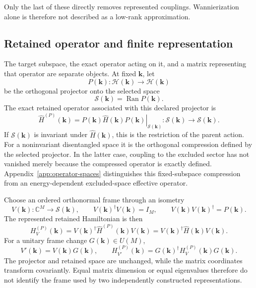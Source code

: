 Only the last of these directly removes represented couplings. Wannierization
alone is therefore not described as a low-rank approximation.

\subsection{Retained operator and finite representation}

The target subspace, the exact operator acting on it, and a matrix representing
that operator are separate objects. At fixed $\mathbf k$, let
\begin{equation}
  P(\mathbf k):
  \mathcal H(\mathbf k)
  \longrightarrow
  \mathcal H(\mathbf k)
\end{equation}
be the orthogonal projector onto the selected space
\begin{equation}
  \mathcal S(\mathbf k)
  =
  \operatorname{Ran}P(\mathbf k).
\end{equation}
The exact retained operator associated with this declared projector is
\begin{equation}
  \widehat H^{(P)}(\mathbf k)
  =
  \left.
    P(\mathbf k)\widehat H(\mathbf k)P(\mathbf k)
  \right|_{\mathcal S(\mathbf k)}:
  \mathcal S(\mathbf k)
  \longrightarrow
  \mathcal S(\mathbf k).
\end{equation}
If $\mathcal S(\mathbf k)$ is invariant under $\widehat H(\mathbf k)$, this is
the restriction of the parent action. For a noninvariant disentangled space it
is the orthogonal compression defined by the selected projector. In the latter
case, coupling to the excluded sector has not vanished merely because the
compressed operator is exactly defined. Appendix~\ref{app:operator-spaces}
distinguishes this fixed-subspace compression from an energy-dependent
excluded-space effective operator.

Choose an ordered orthonormal frame through an isometry
\begin{equation}
  V(\mathbf k):
  \mathbb C^M
  \longrightarrow
  \mathcal S(\mathbf k),
  \qquad
  V(\mathbf k)^{\dagger}V(\mathbf k)=I_M,
  \qquad
  V(\mathbf k)V(\mathbf k)^{\dagger}=P(\mathbf k).
\end{equation}
The represented retained Hamiltonian is then
\begin{equation}
  H_V^{(P)}(\mathbf k)
  =
  V(\mathbf k)^{\dagger}
  \widehat H^{(P)}(\mathbf k)
  V(\mathbf k)
  =
  V(\mathbf k)^{\dagger}
  \widehat H(\mathbf k)
  V(\mathbf k).
\end{equation}
For a unitary frame change $G(\mathbf k)\in U(M)$,
\begin{equation}
  V'(\mathbf k)=V(\mathbf k)G(\mathbf k),
  \qquad
  H_{V'}^{(P)}(\mathbf k)
  =
  G(\mathbf k)^{\dagger}
  H_V^{(P)}(\mathbf k)
  G(\mathbf k).
\end{equation}
The projector and retained space are unchanged, while the matrix coordinates
transform covariantly. Equal matrix dimension or equal eigenvalues therefore
do not identify the frame used by two independently constructed
representations.

